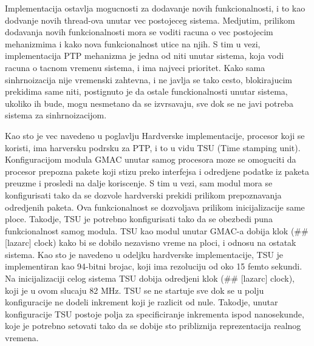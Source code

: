 \documentclass[a4paper,12pt, master]{etf}
\begin{document}
    Implementacija ostavlja mogucnosti za dodavanje novih funkcionalnosti, i to kao dodvanje novih thread-ova
    unutar vec postojeceg sistema. Medjutim, prilikom dodavanja novih funkcionalnosti mora se voditi racuna o
    vec postojecim mehanizmima i kako nova funkcionalnost utice na njih. S tim u vezi, implementacija PTP
    mehanizma je jedna od niti unutar sistema, koja vodi racuna o tacnom vremenu sistema, i ima najveci
    prioritet. Kako sama sinhrnoizacija nije vremenski zahtevna, i ne javlja se tako cesto, blokirajucim
    prekidima same niti, postignuto je da ostale funckionalnosti unutar sistema, ukoliko ih bude, mogu
    nesmetano da se izvrsavaju, sve dok se ne javi potreba sistema za sinhrnoizacijom.

    Kao sto je vec navedeno u poglavlju Hardverske implementacije, procesor koji se koristi, ima harversku
    podrsku za PTP, i to u vidu TSU (Time stamping unit). Konfiguracijom modula GMAC unutar samog procesora
    moze se omoguciti da procesor prepozna pakete koji stizu preko interfejsa i odredjene podatke iz paketa
    preuzme i prosledi na dalje koriscenje. S tim u vezi, sam modul mora se konfigurisati tako da se dozvole
    hardverski prekidi prilikom prepoznavanja odredjenih paketa. Ova funkcionalnost se dozvoljava prilikom
    inicijalizacije same ploce. Takodje, TSU je potrebno konfigurisati tako da se obezbedi puna
    funkcionalnost samog modula. TSU kao modul unutar GMAC-a dobija klok (\#\# [lazarc] clock) kako bi se
    dobilo nezavisno vreme na ploci, i odnosu na ostatak sistema. Kao sto je navedeno u odeljku hardverske
    implementacije, TSU je implementiran kao 94-bitni brojac, koji ima rezoluciju od oko 15 femto sekundi. Na
    inicijalizaciji celog sistema TSU dobija odredjeni klok (\#\# [lazarc] clock), koji je u ovom slucaju 82
    MHz. TSU se ne startuje sve dok se u polju konfiguracije ne dodeli inkrement koji je razlicit od nule.
    Takodje, unutar konfiguracije TSU postoje polja za specificiranje inkrementa ispod nanosekunde, koje je
    potrebno setovati tako da se dobije sto pribliznija reprezentacija realnog vremena.
\end{document}
